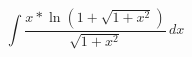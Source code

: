\documentclass[../rgr1.tex]{subfiles}
\begin{document}
\Solution

\begin{equation}
	\int \frac{x * \ln \left( 1 + \sqrt{1 + x^2} \right) }{\sqrt{1 + x^2} } \, dx
\end{equation}

\Answer{
	<++>
}
\end{document}
